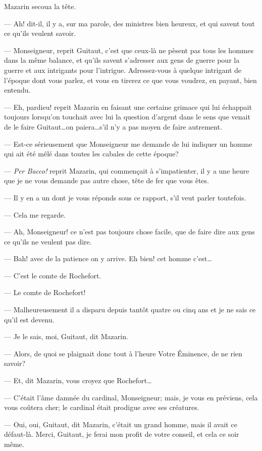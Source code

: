 Mazarin secoua la tête.

— Ah! dit-il, il y a, sur ma parole, des ministres bien heureux, et qui savent tout ce qu'ils veulent savoir.

— Monseigneur, reprit Guitaut, c'est que ceux-là ne pèsent pas tous les hommes dans la même balance, et qu'ils savent s'adresser aux gens de guerre pour la guerre et aux intrigants pour l'intrigue. Adressez-vous à quelque intrigant de l'époque dont vous parlez, et vous en tirerez ce que vous voudrez, en payant, bien entendu.

— Eh, pardieu! reprit Mazarin en faisant une certaine grimace qui lui échappait toujours lorsqu'on touchait avec lui la question d'argent dans le sens que venait de le faire Guitaut\dots on paiera\dots s'il n'y a pas moyen de faire autrement.

— Est-ce sérieusement que Monseigneur me demande de lui indiquer un homme qui ait été mêlé dans toutes les cabales de cette époque?

— \textit{Per Bacco!} reprit Mazarin, qui commençait à s'impatienter, il y a une heure que je ne vous demande pas autre chose, tête de fer que vous êtes.

— Il y en a un dont je vous réponds sous ce rapport, s'il veut parler toutefois.

— Cela me regarde.

— Ah, Monseigneur! ce n'est pas toujours chose facile, que de faire dire aux gens ce qu'ils ne veulent pas dire.

— Bah! avec de la patience on y arrive. Eh bien! cet homme c'est\dots

— C'est le comte de Rochefort.

— Le comte de Rochefort!

— Malheureusement il a disparu depuis tantôt quatre ou cinq ans et je ne sais ce qu'il est devenu.

— Je le sais, moi, Guitaut, dit Mazarin.

— Alors, de quoi se plaignait donc tout à l'heure Votre Éminence, de ne rien savoir?

— Et, dit Mazarin, vous croyez que Rochefort\dots

— C'était l'âme damnée du cardinal, Monseigneur; mais, je vous en préviens, cela vous coûtera cher; le cardinal était prodigue avec ses créatures.

— Oui, oui, Guitaut, dit Mazarin, c'était un grand homme, mais il avait ce défaut-là. Merci, Guitaut, je ferai mon profit de votre conseil, et cela ce soir même.

